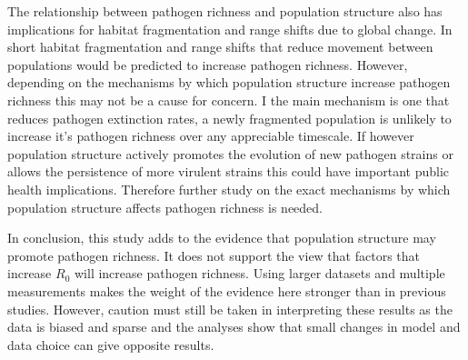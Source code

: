 The relationship between pathogen richness and population structure also has implications for habitat fragmentation and range shifts due to global change.
In short habitat fragmentation and range shifts that reduce movement between populations would be predicted to increase pathogen richness.
However, depending on the mechanisms by which population structure increase pathogen richness this may not be a cause for concern.
I the main mechanism is one that reduces pathogen extinction rates, a newly fragmented population is unlikely to increase it's pathogen richness over any appreciable timescale.
If however population structure actively promotes the evolution of new pathogen strains or allows the persistence of more virulent strains this could have important public health implications.
Therefore further study on the exact mechanisms by which population structure affects pathogen richness is needed. 


In conclusion, this study adds to the evidence that population structure may promote pathogen richness.
It does not support the view that factors that increase $R_0$ will increase pathogen richness.
Using larger datasets and multiple measurements makes the weight of the evidence here stronger than in previous studies.
However, caution must still be taken in interpreting these results as the data is biased and sparse and the analyses show that small changes in model and data choice can give opposite results.























